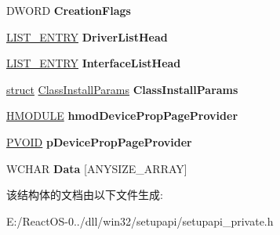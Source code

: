 \begin{DoxyCompactItemize}
\item 
\mbox{\label{struct_device_info_af0136c4a8e9dc7a266ed9f9afe4051a1}} 
D\+W\+O\+RD {\bfseries Creation\+Flags}
\item 
\mbox{\label{struct_device_info_acdabd8677e176246bb441db5c6d24aea}} 
\hyperlink{struct___l_i_s_t___e_n_t_r_y}{L\+I\+S\+T\+\_\+\+E\+N\+T\+RY} {\bfseries Driver\+List\+Head}
\item 
\mbox{\label{struct_device_info_a509d670be19e6da9899ce7c14a0fc7a4}} 
\hyperlink{struct___l_i_s_t___e_n_t_r_y}{L\+I\+S\+T\+\_\+\+E\+N\+T\+RY} {\bfseries Interface\+List\+Head}
\item 
\mbox{\label{struct_device_info_a66449e0a9380e8d474f73288689b817e}} 
\hyperlink{interfacestruct}{struct} \hyperlink{struct_class_install_params}{Class\+Install\+Params} {\bfseries Class\+Install\+Params}
\item 
\mbox{\label{struct_device_info_ab5b61879e054d5bae584e48a81dc74e9}} 
\hyperlink{interfacevoid}{H\+M\+O\+D\+U\+LE} {\bfseries hmod\+Device\+Prop\+Page\+Provider}
\item 
\mbox{\label{struct_device_info_ab45915138149e301e8f3c31033b51840}} 
\hyperlink{interfacevoid}{P\+V\+O\+ID} {\bfseries p\+Device\+Prop\+Page\+Provider}
\item 
\mbox{\label{struct_device_info_a735b06a728c4c76ef006a924142e188e}} 
W\+C\+H\+AR {\bfseries Data} \mbox{[}A\+N\+Y\+S\+I\+Z\+E\+\_\+\+A\+R\+R\+AY\mbox{]}
\end{DoxyCompactItemize}


该结构体的文档由以下文件生成\+:\begin{DoxyCompactItemize}
\item 
E\+:/\+React\+O\+S-\/0../dll/win32/setupapi/setupapi\+\_\+private.\+h\end{DoxyCompactItemize}
